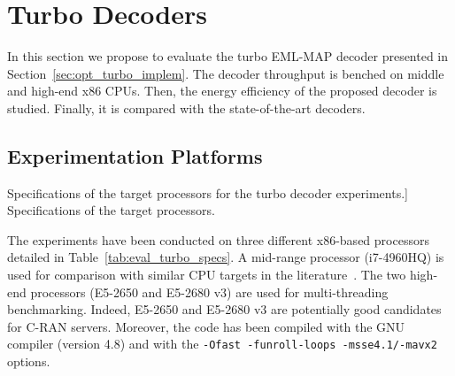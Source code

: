 \section{Turbo Decoders}
\label{sec:eval_turbo}

In this section we propose to evaluate the turbo EML-MAP decoder presented in
Section~\ref{sec:opt_turbo_implem}. The decoder throughput is benched on middle
and high-end x86 CPUs. Then, the energy efficiency of the proposed decoder is
studied. Finally, it is compared with the state-of-the-art decoders.

\subsection{Experimentation Platforms}

\begin{table}[htp]
  \centering
  \caption
    [Specifications of the target processors for the turbo decoder experiments.]
    {Specifications of the target processors.}
  {}
  \label{tab:eval_turbo_specs}
\end{table}

The experiments have been conducted on three different x86-based processors
detailed in Table~\ref{tab:eval_turbo_specs}. A mid-range processor (i7-4960HQ)
is used for comparison with similar CPU targets in the
literature~\cite{Huang2011,Zhang2012,Wu2013}. The two high-end processors
(E5-2650 and E5-2680 v3) are used for multi-threading benchmarking. Indeed,
E5-2650 and E5-2680 v3 are potentially good candidates for C-RAN servers.
Moreover, the code has been compiled with the GNU compiler (version 4.8) and
with the \verb|-Ofast -funroll-loops -msse4.1/-mavx2| options.

